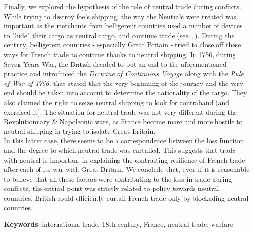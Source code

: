 \documentclass[12pt,a4paper,notitlepage]{article}
\begin{document}
Finally, we explored the hypothesis of the role of neutral trade during conflicts. 
While trying to destroy foe's shipping, the way the Neutrals were treated was important as the merchants from belligerent countries used a number of devices to "hide" their cargo as neutral cargo, and continue trade (see \citep{carriere1973negociants}, \cite{schnakenbourg2013guerre}). 
During the century, belligerent countries - especially Great Britain - tried to close off these ways for French trade to continue thanks to neutral shipping.
In 1756, during Seven Years War, the British decided to put an end to the aforementioned practice and introduced the \textit{Doctrine of Continuous Voyage} along with the \textit{Rule of War of 1756}, that stated that the very beginning of the journey and the very end should be taken into account to determine the nationality of the cargo.
They also claimed the right to seize neutral shipping to look for contraband (and exercised it).
The situation for neutral trade was not very different during the Revolutionnary \& Napoleonic wars, as France become more and more hostile to neutral shipping in trying to isolate Great Britain.\\
In this latter case, there seems to be a correspondence between the loss function and the degree to which neutral trade was curtailed. This suggests  that trade with neutral is important in explaining the contrasting resilience of French trade after each of its war with Great-Britain.
We conclude that, even if it is reasonable to believe that all these factors were contributing to the loss in trade during conflicts, the critical point was strictly related to policy towards neutral countries.
British could efficiently curtail French trade only by blockading neutral countries.





\textbf{Keywords}: international trade, 18th century, France, neutral trade, warfare

\pagebreak

\renewcommand{\baselinestretch}{1.0}\normalsize


\end{document}
